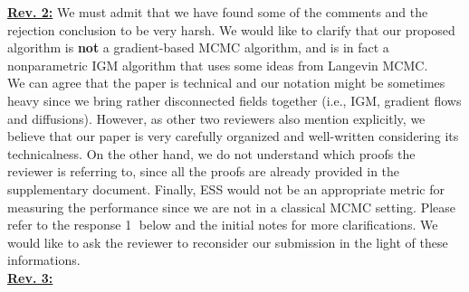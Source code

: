 \documentclass{article}
\newcommand{\rev}[1]{{\color{red} #1}}
\newcommand{\umut}[1]{{\color{blue} #1}}
\newcommand{\antoine}[1]{{\color{orange} #1}}
\newcommand{\ubul}[1]{{\large \color{red} \textcircled{\small #1}}}
\begin{document}
%
\textbf{\color{red} \underline{Rev. 2:}}
%
We must admit that we have found some of the comments and the rejection conclusion to be very harsh. We would like to clarify that our proposed algorithm is \textbf{not} a gradient-based MCMC algorithm, and is in fact a nonparametric IGM algorithm that uses some ideas from Langevin MCMC. \\
%
We can agree that the paper is technical and our notation might be sometimes heavy since we bring rather disconnected fields together (i.e., IGM, gradient flows and diffusions). However, as other two reviewers also mention explicitly, we believe that our paper is very carefully organized and well-written considering its technicalness. On the other hand, we do not understand which proofs the reviewer is referring to, since all the proofs are already provided in the supplementary document. Finally, ESS would not be an appropriate metric for measuring the performance since we are not in a classical MCMC setting. Please refer to the response \ubul{1} below and the initial notes for more clarifications. We would like to ask the reviewer to reconsider our submission in the light of these informations.  \vspace{2pt} \\
% 
%
\textbf{\color{red} \underline{Rev. 3:}}
\end{document}
